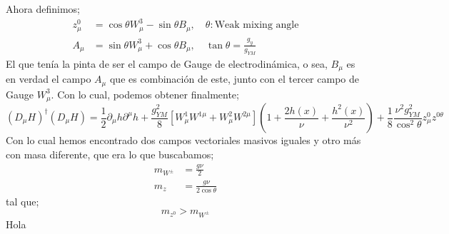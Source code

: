 \documentclass[../main.tex]{subfiles}
\begin{document}
Ahora definimos;
\begin{align}
  z^0_\mu & = \cos{\theta}W^3_\mu - \sin{\theta}B_\mu, \quad \theta: \text{Weak mixing angle} \\
  A_\mu & = \sin{\theta}W^3_\mu + \cos{\theta}B_\mu, \quad \tan{\theta} = \frac{g_{y}}{g_{YM}}
\end{align}
El que tenía la pinta de ser el campo de Gauge de electrodinámica, o sea, $B_\mu$ es en verdad el campo $A_\mu$ que es combinación de este, junto con el tercer campo de Gauge $W^3_\mu$.  
Con lo cual, podemos obtener finalmente;
\begin{equation}
  \left( D_\mu H \right)^\dagger \left( D_\mu H  \right) = \frac{1}{2}\partial_\mu h \partial^\mu h + \frac{g_{YM}^2}{8} \left[ W^1_\mu W^{1\mu} + W^2_\mu W^{2\mu} \right] \left( 1 + \frac{2h(x)}{\nu} + \frac{h^2(x)}{\nu^2} \right) + \frac{1}{8} \frac{\nu^2g_{YM}^2}{\cos^2{\theta}} z^0_\mu z^{0\theta}
 \end{equation}
 Con lo cual hemos encontrado dos campos vectoriales masivos iguales y otro más con masa diferente, que era lo que buscabamos;
 \begin{align*}
   m_{W^\pm} & = \frac{g\nu}{2} \\
   m_z & = \frac{g\nu}{2\cos{\theta}}
 \end{align*}
tal que;
\begin{equation}
  m_{z^0} > m_{W^\pm}
 \end{equation}
 Hola
\end{document}
